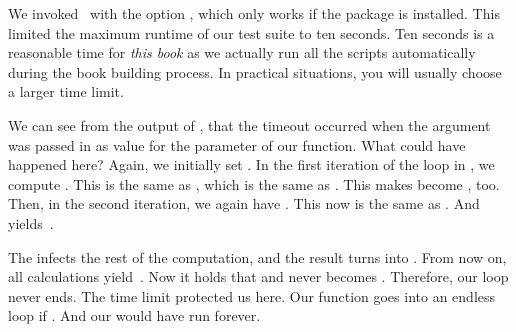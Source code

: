We invoked \pytest\ with the option , which only works if the package  is installed.
This limited the maximum runtime of our test suite to ten seconds.
Ten seconds is a reasonable time for \emph{this book} as we actually run all the scripts automatically during the book building process.
In practical situations, you will usually choose a larger time limit.%
%
%
%
\begin{sloppypar}%
We can see from the output of \pytest, that the timeout occurred when the argument  was passed in as value for the parameter  of our  function.
What could have happened here?
Again, we initially set .
In the first iteration of the loop in , we compute .
This is the same as , which is the same as .
This makes  become , too.
Then, in the second iteration, we again have .
This now is the same as .
And  yields~.
\end{sloppypar}%
%
The  infects the rest of the computation, and the result turns into .
From now on, all calculations yield~.
Now it holds that  and  never becomes .
Therefore, our loop never ends.
The time limit protected us here.
Our  function goes into an endless loop if .
And our  would have run forever.

